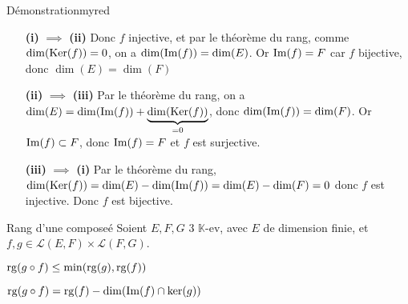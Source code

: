     \begin{demo}{Démonstration}{myred}
        \begin{itemize}[leftmargin=2.5cm]
            \item[\textbf{(i)} $\implies$ \textbf{(ii)}] Donc $f$ injective, et par le théorème du rang, comme $\dim(\operatorname{Ker}(f)) = 0$, on a $\dim(\operatorname{Im}(f)) = \dim(E)$. Or $\operatorname{Im}(f) = F$ car $f$ bijective, donc $\dim(E) = \dim(F)$
            \item[\textbf{(ii)} $\implies$ \textbf{(iii)}] Par le théorème du rang, on a $\dim(E) = \dim(\operatorname{Im}(f)) + \underbrace{\dim(\operatorname{Ker}(f))}_{=0}$, donc $\dim(\operatorname{Im}(f)) = \dim(F)$. Or $\operatorname{Im}(f) \subset F$, donc $\operatorname{Im}(f) = F$ et $f$ est surjective.
            \item[\textbf{(iii)} $\implies$ \textbf{(i)}] Par le théorème du rang, $\dim(\operatorname{Ker}(f)) = \dim(E) - \dim(\operatorname{Im}(f)) = \dim(E) - \dim(F) = 0$ donc $f$ est injective. Donc $f$ est bijective.
        \end{itemize}
    \end{demo}

    \begin{prop}{Rang d’une composeé}{}
        Soient $E,F,G$ 3 $\mathbb{K}$-ev, avec $E$ de dimension finie, et $f,g \in \mathcal{L}(E,F) \times \mathcal{L}(F,G)$. 

        \begin{alors}
            \item $\operatorname{rg}(g \circ f) \leq \min(\operatorname{rg}(g), \operatorname{rg}(f))$ 
            \item $\operatorname{rg}(g \circ f) = \operatorname{rg}(f) - \dim(\operatorname{Im}(f) \cap \ker(g))$
        \end{alors}
    \end{prop}

